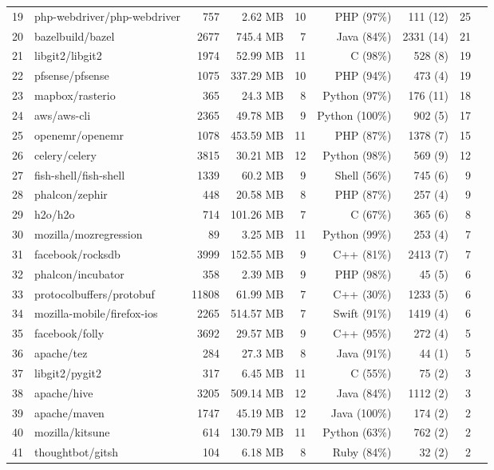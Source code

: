 \begin{table*}[b]
\begin{tabular}{llrr rrr rr}
19 & php-webdriver/php-webdriver & 757 & 2.62 MB & 10 & PHP (97\%)  &111  (12) & 25 \\
20 & bazelbuild/bazel & 2677 & 745.4 MB & 7 & Java (84\%)  &2331  (14) & 21 \\
21 & libgit2/libgit2 & 1974 & 52.99 MB & 11 & C (98\%)  &528  (8) & 19 \\
22 & pfsense/pfsense & 1075 & 337.29 MB & 10 & PHP (94\%)  &473  (4) & 19 \\
23 & mapbox/rasterio & 365 & 24.3 MB & 8 & Python (97\%)  & 176 (11) & 18 \\
24 & aws/aws-cli & 2365 & 49.78 MB & 9 & Python (100\%)  &902  (5) & 17 \\
25 & openemr/openemr & 1078 & 453.59 MB & 11 & PHP (87\%)  &1378  (7) & 15 \\
26 & celery/celery & 3815 & 30.21 MB & 12 & Python (98\%)  &569  (9) & 12 \\
27 & fish-shell/fish-shell & 1339 & 60.2 MB & 9 & Shell (56\%)  &745  (6) & 9 \\
28 & phalcon/zephir & 448 & 20.58 MB & 8 & PHP (87\%)  &257  (4) & 9 \\
29 & h2o/h2o & 714 & 101.26 MB & 7 & C (67\%) &365  (6) & 8 \\
30 & mozilla/mozregression & 89 & 3.25 MB & 11 & Python (99\%) &253  (4) & 7 \\
31 & facebook/rocksdb & 3999 & 152.55 MB & 9 & C++ (81\%)  &2413  (7) & 7 \\
32 & phalcon/incubator & 358 & 2.39 MB & 9 & PHP (98\%) &45  (5) & 6 \\
33 & protocolbuffers/protobuf & 11808 & 61.99 MB & 7 & C++ (30\%)  &1233  (5)  & 6 \\
34 & mozilla-mobile/firefox-ios & 2265 & 514.57 MB & 7 & Swift (91\%)  &1419  (4) & 6 \\
35 & facebook/folly & 3692 & 29.57 MB & 9 & C++ (95\%)  &272  (4) & 5 \\
36 & apache/tez & 284 & 27.3 MB & 8 & Java (91\%)  &44  (1) & 5 \\
37 & libgit2/pygit2 & 317 & 6.45 MB & 11 & C (55\%) &75  (2) & 3 \\
38 & apache/hive & 3205 & 509.14 MB & 12 & Java (84\%)  &1112  (2) & 3 \\
39 & apache/maven & 1747 & 45.19 MB & 12 & Java (100\%)  &174  (2) & 2 \\
40 & mozilla/kitsune & 614 & 130.79 MB & 11 & Python (63\%)  &762  (2) & 2 \\
41 & thoughtbot/gitsh & 104 & 6.18 MB & 8 & Ruby (84\%)  &32  (2) & 2 \\

\end{tabular}
\end{table*}
